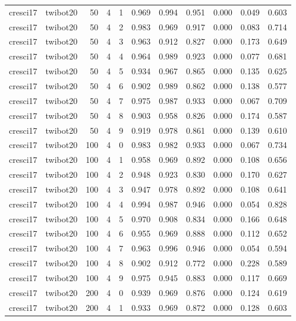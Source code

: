 \begin{tabular}{llrrrrrrrrr}
cresci17 & twibot20 & 50 & 4 & 1 & 0.969 & 0.994 & 0.951 & 0.000 & 0.049 & 0.603 \\
cresci17 & twibot20 & 50 & 4 & 2 & 0.983 & 0.969 & 0.917 & 0.000 & 0.083 & 0.714 \\
cresci17 & twibot20 & 50 & 4 & 3 & 0.963 & 0.912 & 0.827 & 0.000 & 0.173 & 0.649 \\
cresci17 & twibot20 & 50 & 4 & 4 & 0.964 & 0.989 & 0.923 & 0.000 & 0.077 & 0.681 \\
cresci17 & twibot20 & 50 & 4 & 5 & 0.934 & 0.967 & 0.865 & 0.000 & 0.135 & 0.625 \\
cresci17 & twibot20 & 50 & 4 & 6 & 0.902 & 0.989 & 0.862 & 0.000 & 0.138 & 0.577 \\
cresci17 & twibot20 & 50 & 4 & 7 & 0.975 & 0.987 & 0.933 & 0.000 & 0.067 & 0.709 \\
cresci17 & twibot20 & 50 & 4 & 8 & 0.903 & 0.958 & 0.826 & 0.000 & 0.174 & 0.587 \\
cresci17 & twibot20 & 50 & 4 & 9 & 0.919 & 0.978 & 0.861 & 0.000 & 0.139 & 0.610 \\
cresci17 & twibot20 & 100 & 4 & 0 & 0.983 & 0.982 & 0.933 & 0.000 & 0.067 & 0.734 \\
cresci17 & twibot20 & 100 & 4 & 1 & 0.958 & 0.969 & 0.892 & 0.000 & 0.108 & 0.656 \\
cresci17 & twibot20 & 100 & 4 & 2 & 0.948 & 0.923 & 0.830 & 0.000 & 0.170 & 0.627 \\
cresci17 & twibot20 & 100 & 4 & 3 & 0.947 & 0.978 & 0.892 & 0.000 & 0.108 & 0.641 \\
cresci17 & twibot20 & 100 & 4 & 4 & 0.994 & 0.987 & 0.946 & 0.000 & 0.054 & 0.828 \\
cresci17 & twibot20 & 100 & 4 & 5 & 0.970 & 0.908 & 0.834 & 0.000 & 0.166 & 0.648 \\
cresci17 & twibot20 & 100 & 4 & 6 & 0.955 & 0.969 & 0.888 & 0.000 & 0.112 & 0.652 \\
cresci17 & twibot20 & 100 & 4 & 7 & 0.963 & 0.996 & 0.946 & 0.000 & 0.054 & 0.594 \\
cresci17 & twibot20 & 100 & 4 & 8 & 0.902 & 0.912 & 0.772 & 0.000 & 0.228 & 0.589 \\
cresci17 & twibot20 & 100 & 4 & 9 & 0.975 & 0.945 & 0.883 & 0.000 & 0.117 & 0.669 \\
cresci17 & twibot20 & 200 & 4 & 0 & 0.939 & 0.969 & 0.876 & 0.000 & 0.124 & 0.619 \\
cresci17 & twibot20 & 200 & 4 & 1 & 0.933 & 0.969 & 0.872 & 0.000 & 0.128 & 0.603 \\

\end{tabular}
